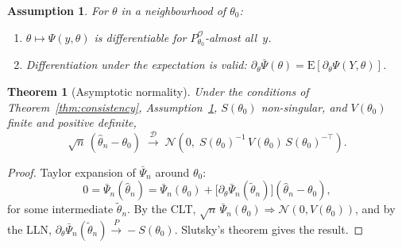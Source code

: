 \documentclass[10pt,a4paper]{amsart}
\newtheorem{theorem}{Theorem}
\newtheorem{assumption}{Assumption}
\newcommand{\E}{\mathrm{E}}
\begin{document}
\begin{assumption}\label{ass:diff}
For $\theta$ in a neighbourhood of $\theta_0$:
\begin{enumerate}
\item $\theta \mapsto \Psi(y, \theta)$ is differentiable for
$P_{\theta_0}^{\mathcal O}$-almost all~$y$.

\item Differentiation under the expectation is valid:
$\partial_\theta \bar\Psi(\theta)
= \E[\partial_\theta \Psi(Y, \theta)]$.
\end{enumerate}
\end{assumption}

\begin{theorem}[Asymptotic normality]\label{thm:AN}
Under the conditions of Theorem~\ref{thm:consistency},
Assumption~\ref{ass:diff}, $S(\theta_0)$ non-singular, and
$V(\theta_0)$ finite and positive definite,
\[
\sqrt{n}\,(\hat\theta_n - \theta_0)
\;\xrightarrow{\;\mathcal D\;}\;
\mathcal N\!\left(0,\;
S(\theta_0)^{-1}\, V(\theta_0)\, S(\theta_0)^{-\top}
\right).
\]
\end{theorem}

\begin{proof}
Taylor expansion of $\bar\Psi_n$ around $\theta_0$:
\[
0 = \bar\Psi_n(\hat\theta_n)
= \bar\Psi_n(\theta_0)
+ \bigl[\partial_\theta \bar\Psi_n(\tilde\theta_n)\bigr]
  (\hat\theta_n - \theta_0),
\]
for some intermediate $\tilde\theta_n$.  By the CLT,
$\sqrt{n}\,\bar\Psi_n(\theta_0) \Rightarrow \mathcal N(0, V(\theta_0))$,
and by the LLN,
$\partial_\theta \bar\Psi_n(\tilde\theta_n) \xrightarrow{P} -S(\theta_0)$.
Slutsky's theorem gives the result.
\end{proof}
\end{document}
